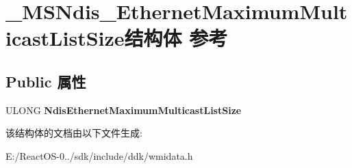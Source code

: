 \hypertarget{struct___m_s_ndis___ethernet_maximum_multicast_list_size}{}\section{\+\_\+\+M\+S\+Ndis\+\_\+\+Ethernet\+Maximum\+Multicast\+List\+Size结构体 参考}
\label{struct___m_s_ndis___ethernet_maximum_multicast_list_size}
\subsection*{Public 属性}
\begin{DoxyCompactItemize}
\item 
\mbox{\label{struct___m_s_ndis___ethernet_maximum_multicast_list_size_ad195bae31f938acca7acc5ad4fd0809d}} 
U\+L\+O\+NG {\bfseries Ndis\+Ethernet\+Maximum\+Multicast\+List\+Size}
\end{DoxyCompactItemize}


该结构体的文档由以下文件生成\+:\begin{DoxyCompactItemize}
\item 
E\+:/\+React\+O\+S-\/0../sdk/include/ddk/wmidata.\+h\end{DoxyCompactItemize}
